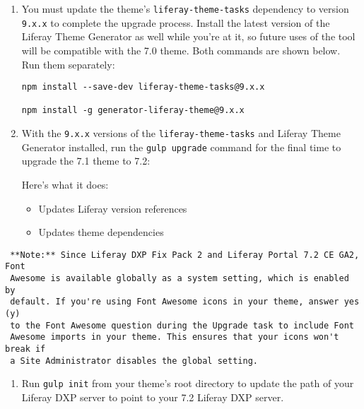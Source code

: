 \begin{enumerate}
\def\labelenumi{\arabic{enumi}.}
\setcounter{enumi}{2}
\item
  You must update the theme's \texttt{liferay-theme-tasks} dependency to
  version \texttt{9.x.x} to complete the upgrade process. Install the
  latest version of the Liferay Theme Generator as well while you're at
  it, so future uses of the tool will be compatible with the 7.0 theme.
  Both commands are shown below. Run them separately:

\begin{verbatim}
npm install --save-dev liferay-theme-tasks@9.x.x

npm install -g generator-liferay-theme@9.x.x
\end{verbatim}
\item
  With the \texttt{9.x.x} versions of the \texttt{liferay-theme-tasks}
  and Liferay Theme Generator installed, run the \texttt{gulp\ upgrade}
  command for the final time to upgrade the 7.1 theme to 7.2:

  Here's what it does:

  \begin{itemize}
  \tightlist
  \item
    Updates Liferay version references
  \item
    Updates theme dependencies
  \end{itemize}
\end{enumerate}

\noindent\hrulefill

\begin{verbatim}
 **Note:** Since Liferay DXP Fix Pack 2 and Liferay Portal 7.2 CE GA2, Font 
 Awesome is available globally as a system setting, which is enabled by 
 default. If you're using Font Awesome icons in your theme, answer yes (y) 
 to the Font Awesome question during the Upgrade task to include Font 
 Awesome imports in your theme. This ensures that your icons won't break if 
 a Site Administrator disables the global setting. 
\end{verbatim}

\noindent\hrulefill

\begin{enumerate}
\def\labelenumi{\arabic{enumi}.}
\setcounter{enumi}{4}
\tightlist
\item
  Run \texttt{gulp\ init} from your theme's root directory to update the
  path of your Liferay DXP server to point to your 7.2 Liferay DXP
  server.
\end{enumerate}

